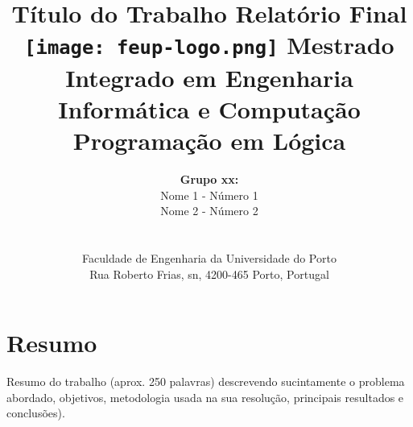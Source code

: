 \documentclass[a4paper]{article}
\begin{document}
\setlength{\textwidth}{16cm}
\setlength{\textheight}{22cm}

\title{\Huge\textbf{Título do Trabalho}\linebreak\linebreak\linebreak
\Large\textbf{Relatório Final}\linebreak\linebreak
\linebreak\linebreak
\texttt{[image: feup-logo.png]}\linebreak\linebreak
\linebreak\linebreak
\Large{Mestrado Integrado em Engenharia Informática e Computação} \linebreak\linebreak
\Large{Programação em Lógica}\linebreak
}

\author{\textbf{Grupo xx:}\\ Nome 1 - Número 1 \\ Nome 2 - Número 2 \\\linebreak\linebreak \\
 \\ Faculdade de Engenharia da Universidade do Porto \\ Rua Roberto Frias, s\/n, 4200-465 Porto, Portugal \linebreak\linebreak\linebreak
\linebreak\linebreak\vspace{1cm}}
\maketitle
\thispagestyle{empty}


\newpage

\section*{Resumo}
Resumo do trabalho (aprox. 250 palavras) descrevendo sucintamente o problema abordado, objetivos, metodologia usada na sua resolução, principais resultados e conclusões).
\end{document}
